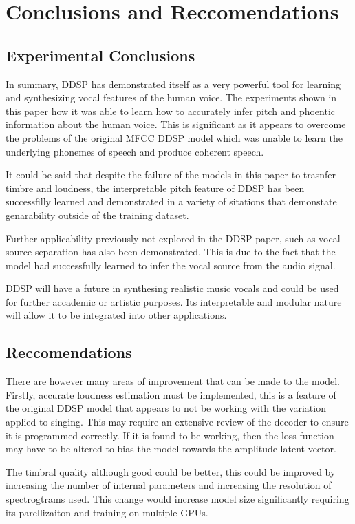 \chapter{Conclusions and Reccomendations}

\section{Experimental Conclusions}

In summary, DDSP has demonstrated itself as a very powerful tool for learning and synthesizing vocal features of the human voice. The experiments shown in this paper how it was able to learn how to accurately infer pitch and phoentic information about the human voice. This is significant as it appears to overcome the problems of the original MFCC DDSP model\cite{SingingDDSP} which was unable to learn the underlying phonemes of speech and produce coherent speech.

It could be said that despite the failure of the models in this paper to trasnfer timbre and loudness, the interpretable pitch feature of DDSP has been successfilly learned and demonstrated in a variety of sitations that demonstate genarability outside of the training dataset.

Further applicability previously not explored in the DDSP paper, such as vocal source separation has also been demonstrated. This is due to the fact that the model had successfully learned to infer the vocal source from the audio signal.

DDSP will have a future in synthesing realistic music vocals and could be used for further accademic or artistic purposes. Its interpretable and modular nature will allow it to be integrated into other applications.

\section{Reccomendations}

There are however many areas of improvement that can be made to the model. Firstly, accurate loudness estimation must be implemented, this is a feature of the original DDSP model\cite{OriginalDDSP} that appears to not be working with the variation applied to singing. This may require an extensive review of the decoder to ensure it is programmed correctly. If it is found to be working, then the loss function may have to be altered to bias the model towards the amplitude latent vector.

The timbral quality although good could be better, this could be improved by increasing the number of internal parameters and increasing the resolution of spectrogtrams used. This change would increase model size significantly requiring its parellizaiton and training on multiple GPUs.

